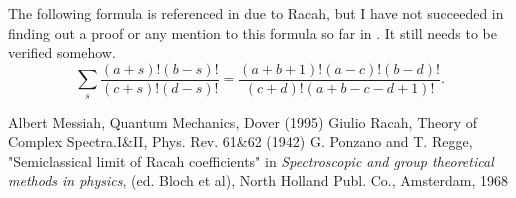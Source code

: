 \documentclass{article}
\begin{document}
The following formula is referenced in \cite{Messiah} due to Racah, but I have not succeeded in finding out a proof or any mention to this formula so far in \cite{Racah}. It still needs to be verified somehow.
\begin{equation}
\label{eq:general_binomial_coeff}
\sum_{s} \frac{(a+s)!(b-s)!}{(c+s)!(d-s)!} = \frac{(a+b+1)!(a-c)!(b-d)!}{(c+d)!(a+b-c-d+1)!}.
\end{equation}
\begin{thebibliography}{10}
  Albert Messiah, Quantum Mechanics, Dover (1995)
  Giulio Racah, Theory of Complex Spectra.I\&II, Phys. Rev. 61\&62 (1942)
  G. Ponzano and T. Regge, "Semiclassical limit of Racah coefficients" in \textit{Spectroscopic and group theoretical methods in physics}, (ed. Bloch et al), North Holland Publ. Co., Amsterdam, 1968
\end{thebibliography}
\end{document}
